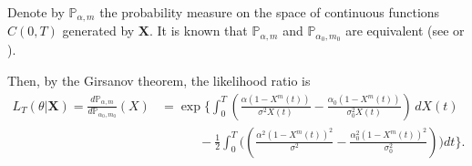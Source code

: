 \documentclass[12pt, reqno]{amsart}
\newcommand{\fer}[1]{{\textcolor{blue}{#1}}}
\newcommand{\Pb}{\mathbb P}
\newcommand{\1}{{\bf 1}}
\newcommand{\2}{{\bf 2}}
\newcommand{\lp}{\left(}
\newcommand{\rp}{\right)}
\newcommand{\lc}{\left[}
\newcommand{\rc}{\right]}
\theoremstyle{definition}
\theoremstyle{remark}
\numberwithin{equation}{section}
\begin{document}
Denote by $\Pb_{\alpha,m}$ the probability measure on the space of continuous functions $C(0,T)$ generated by $\bm X$. It is known that $\Pb_{\alpha,m}$ and $\Pb_{\alpha_0,m_0}$ are equivalent (see \cite{iacus} or \cite{li-sh}).




Then, by the Girsanov theorem, the likelihood ratio is 
\begin{align}\label{likelihood}
L_T(\theta|\bm X)=\frac{d\Pb_{\alpha,m}}{ d\Pb_{\alpha_0,m_0}}(X) & =\exp\Bigg\{ \int_0^T \left(\frac{\alpha(1-X^m(t))}{\sigma^2 X(t)}-\frac{\alpha_0(1-X^m(t))}{\sigma_0^2 X(t)}\right) \, dX(t)\nonumber  \\ 
& \qquad\quad -\frac{1}{2} \int_0^T \Bigg(\left(\frac{\alpha^2(1-X^m(t))^2}{\sigma^2}-\frac{\alpha^2_0(1-X^m(t))^2}{\sigma_0^2}\right)\Bigg) dt  \Bigg\}.
\end{align} 
\end{document}
